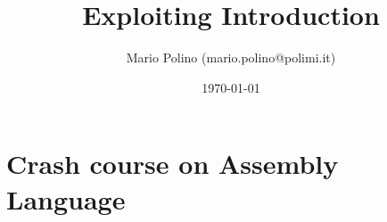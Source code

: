 \documentclass[]{beamer}
\title{Exploiting Introduction}    %
\author[M. Polino]{Mario Polino (mario.polino@polimi.it)}        %
\institute{Politecnico di Milano\\ \vspace{1cm} Special thanks to Andrea Mambretti}      %
\date{\today}                    %
\begin{document}
\begin{frame}
  \titlepage
\end{frame}

\section[Outline]{}

\begin{frame}
  \tableofcontents
\end{frame}
\section {Crash course on Assembly Language}
\end{document}
